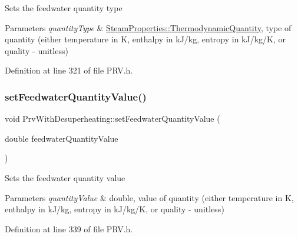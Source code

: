 Sets the feedwater quantity type


\begin{DoxyParams}{Parameters}
{\em quantity\+Type} & \hyperlink{class_steam_properties_ae0294bedf7d178c2d8fb6aed0f62fbff}{Steam\+Properties\+::\+Thermodynamic\+Quantity}, type of quantity (either temperature in K, enthalpy in k\+J/kg, entropy in k\+J/kg/K, or quality -\/ unitless) \\
\hline
\end{DoxyParams}


Definition at line 321 of file P\+R\+V.\+h.

\mbox{\label{class_prv_with_desuperheating_afc17940f7d61898eda1bb4a6f1fea8c3}} 
\subsubsection{\texorpdfstring{set\+Feedwater\+Quantity\+Value()}{setFeedwaterQuantityValue()}}
{\footnotesize\ttfamily void Prv\+With\+Desuperheating\+::set\+Feedwater\+Quantity\+Value (\begin{DoxyParamCaption}\item[{double}]{feedwater\+Quantity\+Value }\end{DoxyParamCaption})\hspace{0.3cm}{\ttfamily [inline]}}

Sets the feedwater quantity value


\begin{DoxyParams}{Parameters}
{\em quantity\+Value} & double, value of quantity (either temperature in K, enthalpy in k\+J/kg, entropy in k\+J/kg/K, or quality -\/ unitless) \\
\hline
\end{DoxyParams}


Definition at line 339 of file P\+R\+V.\+h.

\mbox{\label{class_prv_with_desuperheating_a3b018b525bfb4106cc81ac982d9daa9b}} 
